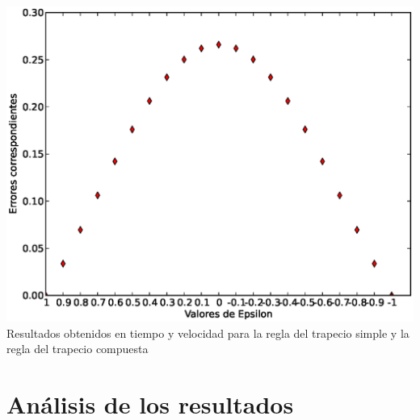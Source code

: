 \includegraphics[width=1.25\textwidth]{images/imgraf}
Resultados obtenidos en tiempo y velocidad para la regla del trapecio simple y la regla del trapecio compuesta


\section{Análisis de los resultados}
\label{3:sec:4}
\parindent=1cm
\raggedright
 
